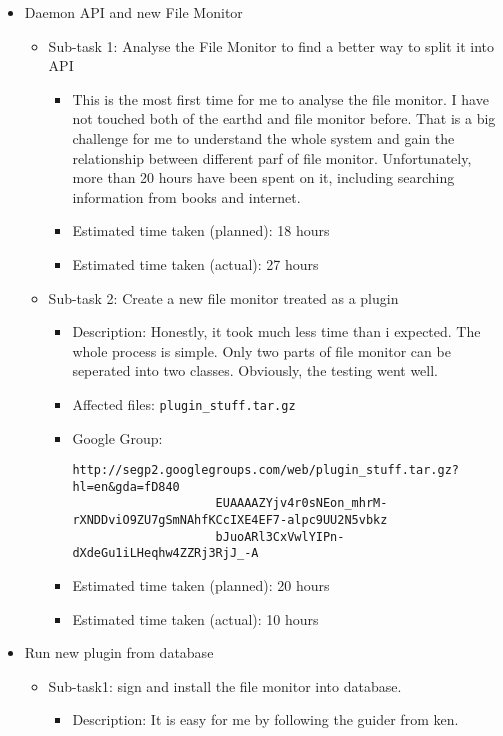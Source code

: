 \begin{itemize}
	\item Daemon API and new File Monitor
	     \begin{itemize}
	        \item Sub-task 1: Analyse the File Monitor to find a better way to split it into API
	           \begin{itemize}
					\item This is the most first time for me to analyse the file monitor. I have not touched both of the earthd and file monitor before. That is a big challenge for me to understand the whole system and gain the relationship between different parf of file monitor. Unfortunately, more than 20 hours have been spent on it, including searching information from books and internet. 
					\item Estimated time taken (planned): 18 hours
					\item Estimated time taken (actual): 27 hours
				\end{itemize}
			\item Sub-task 2: Create a new file monitor treated as a plugin
			   \begin{itemize}
					\item Description: Honestly, it took much less time than i expected. The whole process is simple. Only two parts of file monitor can be seperated into two classes. Obviously, the testing went well.
					\item Affected files: \texttt{plugin\_stuff.tar.gz} 
					\item Google Group: \begin{verbatim}http://segp2.googlegroups.com/web/plugin_stuff.tar.gz?hl=en&gda=fD840
					EUAAAAZYjv4r0sNEon_mhrM-rXNDDviO9ZU7gSmNAhfKCcIXE4EF7-alpc9UU2N5vbkz
					bJuoARl3CxVwlYIPn-dXdeGu1iLHeqhw4ZZRj3RjJ_-A\end{verbatim}
					\item Estimated time taken (planned): 20 hours
					\item Estimated time taken (actual): 10 hours
				\end{itemize}
	     \end{itemize}
	\item Run new plugin from database
	     \begin{itemize}
	         \item Sub-task1: sign and install the file monitor into database.
	            \begin{itemize}
							\item Description: It is easy for me by following the guider from ken. 

\end{itemize}
\end{itemize}
\end{itemize}
